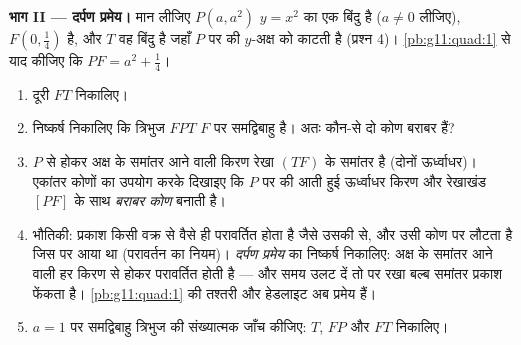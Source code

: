 \begin{problem}
\medskip
\noindent\textbf{भाग II --- दर्पण प्रमेय।}
मान लीजिए $P(a, a^2)$  $y = x^2$ का एक बिंदु है ($a \neq 0$ लीजिए), $F\left(0, \frac14\right)$  है, और
$T$ वह बिंदु है जहाँ $P$ पर की  $y$-अक्ष को काटती है
(प्रश्न 4)। \cref{pb:g11:quad:1} से याद कीजिए कि $PF = a^2 + \frac14$।
\begin{enumerate}[resume]
  \item दूरी $FT$ निकालिए।
  \item निष्कर्ष निकालिए कि त्रिभुज $FPT$ $F$ पर समद्विबाहु है। अतः
        कौन-से दो कोण बराबर हैं?
  \item $P$ से होकर अक्ष के समांतर आने वाली किरण रेखा $(TF)$ के समांतर है
        (दोनों ऊर्ध्वाधर)। एकांतर कोणों का उपयोग करके दिखाइए कि $P$ पर की
         आती हुई ऊर्ध्वाधर किरण और रेखाखंड $[PF]$ के साथ
        \emph{बराबर कोण} बनाती है।
  \item भौतिकी: प्रकाश किसी वक्र से वैसे ही परावर्तित होता है जैसे उसकी
         से, और उसी कोण पर लौटता है जिस पर आया था (परावर्तन का
        नियम)। \emph{दर्पण प्रमेय} का निष्कर्ष निकालिए: अक्ष के समांतर आने
        वाली हर किरण  से होकर परावर्तित होती है --- और समय उलट दें तो
         पर रखा बल्ब समांतर प्रकाश फेंकता है। \cref{pb:g11:quad:1} की तश्तरी और
        हेडलाइट अब प्रमेय हैं।
  \item $a = 1$ पर समद्विबाहु त्रिभुज की संख्यात्मक जाँच कीजिए: $T$, $FP$
        और $FT$ निकालिए।
\end{enumerate}


\end{problem}
